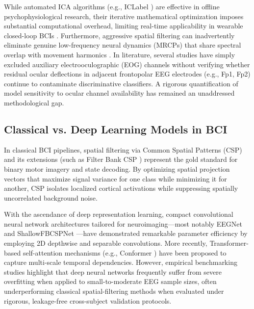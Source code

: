 \documentclass[review,12pt]{elsarticle}
\begin{document}
While automated ICA algorithms (e.g., ICLabel \cite{pion2019iclabel}) are effective in offline psychophysiological research, their iterative mathematical optimization imposes substantial computational overhead, limiting real-time applicability in wearable closed-loop BCIs \cite{uribe2021review}. Furthermore, aggressive spatial filtering can inadvertently eliminate genuine low-frequency neural dynamics (MRCPs) that share spectral overlap with movement harmonics \cite{kline2015locomotion}. In literature, several studies have simply excluded auxiliary electrooculographic (EOG) channels without verifying whether residual ocular deflections in adjacent frontopolar EEG electrodes (e.g., Fp1, Fp2) continue to contaminate discriminative classifiers. A rigorous quantification of model sensitivity to ocular channel availability has remained an unaddressed methodological gap.

\subsection{Classical vs. Deep Learning Models in BCI}
In classical BCI pipelines, spatial filtering via Common Spatial Patterns (CSP) \cite{ramoser2000optimal, blankertz2008optimizing} and its extensions (such as Filter Bank CSP \cite{ang2012filter}) represent the gold standard for binary motor imagery and state decoding. By optimizing spatial projection vectors that maximize signal variance for one class while minimizing it for another, CSP isolates localized cortical activations while suppressing spatially uncorrelated background noise.

With the ascendance of deep representation learning, compact convolutional neural network architectures tailored for neuroimaging---most notably EEGNet \cite{lawhern2018eegnet} and ShallowFBCSPNet \cite{schirrmeister2017eeg}---have demonstrated remarkable parameter efficiency by employing 2D depthwise and separable convolutions. More recently, Transformer-based self-attention mechanisms (e.g., Conformer \cite{song2022eeg}) have been proposed to capture multi-scale temporal dependencies. However, empirical benchmarking studies \cite{lotte2018review, roy2019deep} highlight that deep neural networks frequently suffer from severe overfitting when applied to small-to-moderate EEG sample sizes, often underperforming classical spatial-filtering methods when evaluated under rigorous, leakage-free cross-subject validation protocols.

\end{document}
